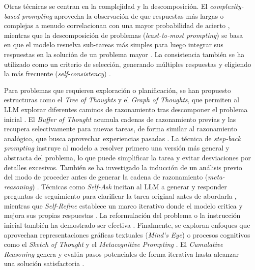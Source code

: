 Otras técnicas se centran en la complejidad y la descomposición. El \textit{complexity-based prompting} aprovecha la observación de que respuestas más largas o complejas a menudo correlacionan con una mayor probabilidad de acierto \citep{fuComplexityBasedPromptingMultiStep2023}, mientras que la descomposición de problemas (\textit{least-to-most prompting}) se basa en que el modelo resuelva sub-tareas más simples para luego integrar sus respuestas en la solución de un problema mayor \citep{zhouLeasttoMostPromptingEnables2023}. La consistencia también se ha utilizado como un criterio de selección, generando múltiples respuestas y eligiendo la más frecuente (\textit{self-consistency}) \citep{wangSelfConsistencyImprovesChain2023}.

Para problemas que requieren exploración o planificación, se han propuesto estructuras como el \textit{Tree of Thoughts} y el \textit{Graph of Thoughts}, que permiten al LLM explorar diferentes caminos de razonamiento tras descomponer el problema inicial \citep{yaoTreeThoughtsDeliberate2023, bestaGraphThoughtsSolving2024}. El \textit{Buffer of Thought} \citep{yangBufferThoughtsThoughtAugmented2024} acumula cadenas de razonamiento previas y las recupera selectivamente para nuevas tareas, de forma similar al razonamiento analógico, que busca aprovechar experiencias pasadas \citep{yasunagaLargeLanguageModels2024}. La técnica de \textit{step-back prompting} instruye al modelo a resolver primero una versión más general y abstracta del problema, lo que puede simplificar la tarea y evitar desviaciones por detalles excesivos. También se ha investigado la inducción de un análisis previo del modo de proceder antes de generar la cadena de razonamiento (\textit{meta-reasoning}) \citep{gaoMetaReasoningLarge2024}. Técnicas como \textit{Self-Ask} incitan al LLM a generar y responder preguntas de seguimiento para clarificar la tarea original antes de abordarla \citep{pressMeasuringNarrowingCompositionality2023}, mientras que \textit{Self-Refine} establece un marco iterativo donde el modelo critica y mejora sus propias respuestas \citep{madaanSelfRefineIterativeRefinement2023}. La reformulación del problema o la instrucción inicial también ha demostrado ser efectiva \citep{mishraReframingInstructionalPrompts2022, dengRephraseRespondLet2024}. Finalmente, se exploran enfoques que aprovechan representaciones gráficas textuales (\textit{Mind's Eye}) \citep{wuMindsEyeLLMs} o procesos cognitivos como el \textit{Sketch of Thought} \citep{aytesSketchofThoughtEfficientLLM2025} y el \textit{Metacognitive Prompting} \citep{wangMetacognitivePromptingImproves2024}. El \textit{Cumulative Reasoning} genera y evalúa pasos potenciales de forma iterativa hasta alcanzar una solución satisfactoria \citep{zhangCumulativeReasoningLarge2025}.

